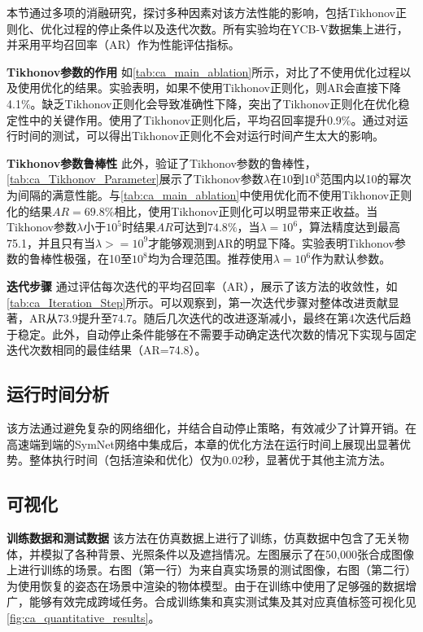 本节通过多项的消融研究，探讨多种因素对该方法性能的影响，包括Tikhonov正则化、优化过程的停止条件以及迭代次数。所有实验均在YCB-V数据集上进行，并采用平均召回率（AR）作为性能评估指标。

\textbf{Tikhonov参数的作用 } 如\autoref{tab:ca_main_ablation}所示，对比了不使用优化过程以及使用优化的结果。实验表明，如果不使用Tikhonov正则化，则AR会直接下降4.1\%。缺乏Tikhonov正则化会导致准确性下降，突出了Tikhonov正则化在优化稳定性中的关键作用。使用了Tikhonov正则化后，平均召回率提升0.9\%。通过对运行时间的测试，可以得出Tikhonov正则化不会对运行时间产生太大的影响。



\textbf{Tikhonov参数鲁棒性 } 此外，验证了Tikhonov参数的鲁棒性，\autoref{tab:ca_Tikhonov_Parameter}展示了Tikhonov参数$\lambda$在$10$到$10^8$范围内以10的幂次为间隔的满意性能。与\autoref{tab:ca_main_ablation}中使用优化而不使用Tikhonov正则化的结果$AR=69.8\%$相比，使用Tikhonov正则化可以明显带来正收益。当Tikhonov参数$\lambda$小于$10^5$时结果$AR$可达到$74.8\%$，当$\lambda=10^6$，算法精度达到最高75.1，并且只有当$\lambda>=10^9$才能够观测到AR的明显下降。实验表明Tikhonov参数的鲁棒性极强，在10至$10^8$均为合理范围。推荐使用$\lambda=10^6$作为默认参数。



\textbf{迭代步骤 } 通过评估每次迭代的平均召回率（AR），展示了该方法的收敛性，如\autoref{tab:ca_Iteration_Step}所示。可以观察到，第一次迭代步骤对整体改进贡献显著，AR从73.9提升至74.7。随后几次迭代的改进逐渐减小，最终在第4次迭代后趋于稳定。此外，自动停止条件能够在不需要手动确定迭代次数的情况下实现与固定迭代次数相同的最佳结果（AR=74.8）。



\subsection{运行时间分析}

该方法通过避免复杂的网络细化，并结合自动停止策略，有效减少了计算开销。在高速端到端的SymNet网络中集成后，本章的优化方法在运行时间上展现出显著优势。整体执行时间（包括渲染和优化）仅为0.02秒，显著优于其他主流方法。

\subsection{可视化}
\par \textbf{训练数据和测试数据 } 该方法在仿真数据上进行了训练，仿真数据中包含了无关物体，并模拟了各种背景、光照条件以及遮挡情况。左图展示了在50,000张合成图像上进行训练的场景。右图（第一行）为来自真实场景的测试图像，右图（第二行）为使用恢复的姿态在场景中渲染的物体模型。由于在训练中使用了足够强的数据增广，能够有效完成跨域任务。合成训练集和真实测试集及其对应真值标签可视化见\autoref{fig:ca_quantitative_results}。


